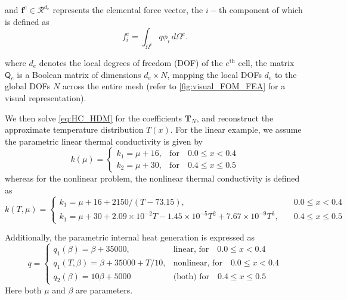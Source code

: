 \documentclass[11pt]{article}
\renewcommand{\vec}[1]{\mathbf{#1}}
\newcommand{\mat}[1]{\mathsf{#1}}
\begin{document}
and \( \vec{f}^e\in\mathcal{R}^{d_e} \) represents the elemental force vector, the $i-$th component of which is defined as
\begin{equation}
{f}^e_i = \int_{{\Omega}^e} q \phi_i \, d\Omega^{e}.
\label{eq:f_N_ij}
\end{equation}

where  \( d_e \) denotes the local degrees of freedom (DOF) of the \( e^{\text{th}} \) cell, the matrix \( \mat{Q}_e \) is a Boolean matrix of dimensions \( d_e \times N \), mapping the local DOFs \( d_e \) to the global DOFs \( N \) across the entire mesh (refer to \cref{fig:visual_FOM_FEA} for a visual representation).


We then solve \cref{eq:HC_HDM} for the coefficients \( \vec{T}_N \), and reconstruct the approximate temperature distribution \( T(x) \).
For the linear example, we assume the parametric linear thermal conductivity is given by
\begin{equation}
k(\mu) = 
\begin{cases} 
k_1 = \mu + 16, & \text{for} \quad 0.0 \leq x < 0.4   \\ 
k_2 = \mu + 30, & \text{for} \quad 0.4 \leq x \leq 0.5   
\end{cases}
\label{eq:k_mu_L}
\end{equation}
whereas for the nonlinear problem, the nonlinear thermal conductivity is defined as
\begin{equation}
k(T,\mu) = 
\begin{cases} 
k_1 =\mu + 16 + 2150/(T - 73.15),  &\quad 0.0 \leq x < 0.4 \\ 
k_1 =\mu + 30 + 2.09 \times 10^{-2} T - 1.45 \times 10^{-5} T^2 + 7.67 \times 10^{-9} T^3, & \quad 0.4 \leq x \leq 0.5 
\end{cases}
\label{eq:k_mu_NL}
\end{equation}

Additionally, the parametric internal heat generation is expressed as
\begin{equation}
q= 
\begin{cases} 
q_1(\beta) = \beta + 35000, & \text{linear, for} \quad 0.0 \leq x < 0.4 \\ 
q_1(T,\beta) = \beta + 35000 + T/10, & \text{nonlinear, for} \quad 0.0 \leq x < 0.4 \\ 
q_2(\beta) = 10\beta + 5000 & \text{(both) for} \quad 0.4 \leq x \leq 0.5 
\end{cases}
\label{eq:q_beta}
\end{equation}
Here both $\mu$ and $\beta$ are parameters.
\end{document}
